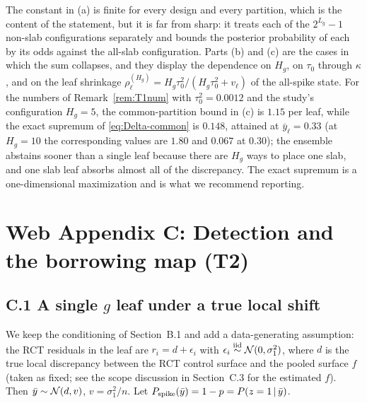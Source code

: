 \begin{remA}\label{rem:constants}
The constant in (a) is finite for every design and every partition, which is the content of the statement, but it is far from sharp: it treats each of the $2^{L_g}-1$ non-slab configurations separately and bounds the posterior probability of each by its odds against the all-slab configuration. Parts (b) and (c) are the cases in which the sum collapses, and they display the dependence on $H_g$, on $\tau_0$ through $\kappa$, and on the leaf shrinkage $\rho^{(H_g)}_\ell=H_g\tau_0^2/(H_g\tau_0^2+v_\ell)$ of the all-spike state. For the numbers of Remark~\ref{rem:T1num} with $\tau_0^2=0.0012$ and the study's configuration $H_g=5$, the common-partition bound in (c) is $1.15$ per leaf, while the exact supremum of \eqref{eq:Delta-common} is $0.148$, attained at $\bar y_\ell=0.33$ (at $H_g=10$ the corresponding values are $1.80$ and $0.067$ at $0.30$); the ensemble abstains sooner than a single leaf because there are $H_g$ ways to place one slab, and one slab leaf absorbs almost all of the discrepancy. The exact supremum is a one-dimensional maximization and is what we recommend reporting.
\end{remA}

\section*{Web Appendix C: Detection and the borrowing map (T2)}

\subsection*{C.1 A single $g$ leaf under a true local shift}

We keep the conditioning of Section~B.1 and add a data-generating assumption: the RCT residuals in the leaf are $r_i=d+\epsilon_i$ with $\epsilon_i\stackrel{\text{iid}}{\sim}\mathcal{N}(0,\sigma_1^2)$, where $d$ is the true local discrepancy between the RCT control surface and the pooled surface $f$ (taken as fixed; see the scope discussion in Section~C.3 for the estimated $f$). Then $\bar y\sim\mathcal{N}(d,v)$, $v=\sigma_1^2/n$. Let $P_{\mathrm{spike}}(\bar y)=1-p=P(z=1\,\vert\,\bar y)$.

